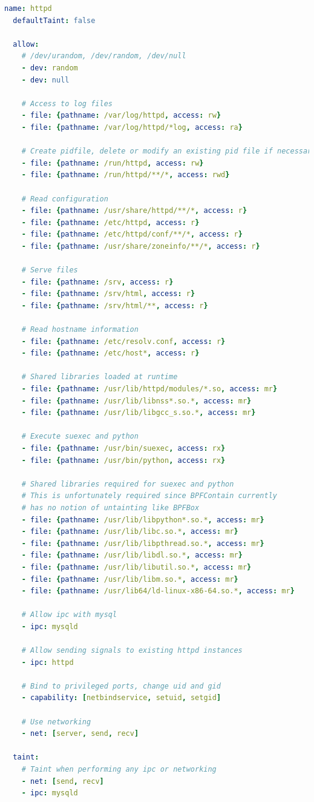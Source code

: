 \documentclass[
  fontsize=12pt,
  titlepage=firstiscover,
  paper=letter,
oneside,
  cleardoublepage=plain,
  parskip=half-,
  DIV=10,
  parindent,
  appendixprefix,
  chapterprefix,
  listof=totoc,
]{scrbook}
\newcommand{\bpfcontain}{\textsc{BPFContain}}
\begin{document}
\begin{lstlisting}[language=yaml, gobble=2, float=false, caption={[A \bpfcontain{} policy for Apache httpd]
  A \bpfcontain{} policy for Apache httpd.
}, label={lst:bpfcontain-apache}]
  name: httpd
  defaultTaint: false

  allow:
    # /dev/urandom, /dev/random, /dev/null
    - dev: random
    - dev: null

    # Access to log files
    - file: {pathname: /var/log/httpd, access: rw}
    - file: {pathname: /var/log/httpd/*log, access: ra}

    # Create pidfile, delete or modify an existing pid file if necessary
    - file: {pathname: /run/httpd, access: rw}
    - file: {pathname: /run/httpd/**/*, access: rwd}

    # Read configuration
    - file: {pathname: /usr/share/httpd/**/*, access: r}
    - file: {pathname: /etc/httpd, access: r}
    - file: {pathname: /etc/httpd/conf/**/*, access: r}
    - file: {pathname: /usr/share/zoneinfo/**/*, access: r}

    # Serve files
    - file: {pathname: /srv, access: r}
    - file: {pathname: /srv/html, access: r}
    - file: {pathname: /srv/html/**, access: r}

    # Read hostname information
    - file: {pathname: /etc/resolv.conf, access: r}
    - file: {pathname: /etc/host*, access: r}

    # Shared libraries loaded at runtime
    - file: {pathname: /usr/lib/httpd/modules/*.so, access: mr}
    - file: {pathname: /usr/lib/libnss*.so.*, access: mr}
    - file: {pathname: /usr/lib/libgcc_s.so.*, access: mr}

    # Execute suexec and python
    - file: {pathname: /usr/bin/suexec, access: rx}
    - file: {pathname: /usr/bin/python, access: rx}

    # Shared libraries required for suexec and python
    # This is unfortunately required since BPFContain currently
    # has no notion of untainting like BPFBox
    - file: {pathname: /usr/lib/libpython*.so.*, access: mr}
    - file: {pathname: /usr/lib/libc.so.*, access: mr}
    - file: {pathname: /usr/lib/libpthread.so.*, access: mr}
    - file: {pathname: /usr/lib/libdl.so.*, access: mr}
    - file: {pathname: /usr/lib/libutil.so.*, access: mr}
    - file: {pathname: /usr/lib/libm.so.*, access: mr}
    - file: {pathname: /usr/lib64/ld-linux-x86-64.so.*, access: mr}

    # Allow ipc with mysql
    - ipc: mysqld

    # Allow sending signals to existing httpd instances
    - ipc: httpd

    # Bind to privileged ports, change uid and gid
    - capability: [netbindservice, setuid, setgid]

    # Use networking
    - net: [server, send, recv]

  taint:
    # Taint when performing any ipc or networking
    - net: [send, recv]
    - ipc: mysqld
\end{lstlisting}
\end{document}
